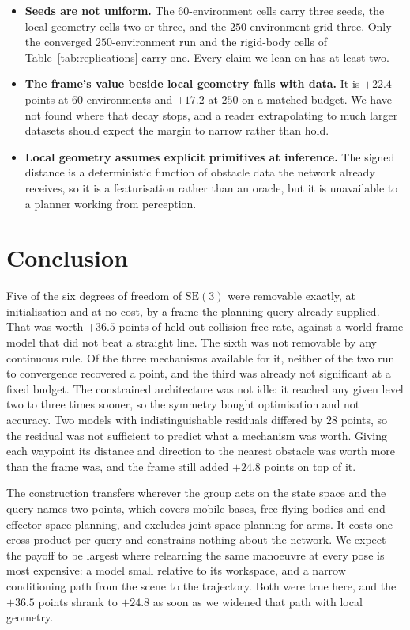 \documentclass[10pt,twocolumn,letterpaper]{article}
\newcommand{\SE}{\mathrm{SE}(3)}
\begin{document}
\begin{itemize}
  \item \textbf{Seeds are not uniform.} The $60$-environment cells carry three
  seeds, the local-geometry cells two or three, and the $250$-environment grid
  three. Only the converged $250$-environment run and the rigid-body cells of
  Table~\ref{tab:replications} carry one. Every claim we lean on has at least two.

  \item \textbf{The frame's value beside local geometry falls with data.} It is
  $+22.4$ points at $60$ environments and $+17.2$ at $250$ on a matched budget.
  We have not found where that decay stops, and a reader extrapolating to much
  larger datasets should expect the margin to narrow rather than hold.

  \item \textbf{Local geometry assumes explicit primitives at inference.} The
  signed distance is a deterministic function of obstacle data the network
  already receives, so it is a featurisation rather than an oracle, but it is
  unavailable to a planner working from perception.
\end{itemize}

\section{Conclusion}

Five of the six degrees of freedom of $\SE$ were removable exactly, at
initialisation and at no cost, by a frame the planning query already supplied.
That was worth $+36.5$ points of held-out collision-free rate, against a
world-frame model that did not beat a straight line. The sixth was not removable
by any continuous rule. Of the three mechanisms available for it, neither of the
two run to convergence recovered a point, and the third was already not
significant at a fixed budget. The constrained architecture was not idle: it reached any given
level two to three times sooner, so the symmetry bought optimisation and not
accuracy. Two models with indistinguishable residuals differed by $28$ points,
so the residual was not sufficient to predict what a mechanism was worth.
Giving each waypoint its distance and direction to the nearest obstacle was worth
more than the frame was, and the frame still added $+24.8$ points on top of it.

The construction transfers wherever the group acts on the state space and the
query names two points, which covers mobile bases, free-flying bodies and
end-effector-space planning, and excludes joint-space planning for arms. It costs
one cross product per query and constrains nothing about the network. We expect
the payoff to be largest where relearning the same manoeuvre at every pose is
most expensive: a model small relative to its workspace, and a narrow
conditioning path from the scene to the trajectory. Both were true here, and the
$+36.5$ points shrank to $+24.8$ as soon as we widened that path with local
geometry.
\end{document}
